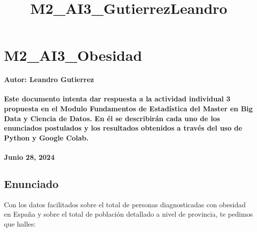 \documentclass[11pt]{article}
\title{M2\_AI3\_GutierrezLeandro}
\begin{document}
    
    \maketitle
    
    

    
    \section{M2\_AI3\_Obesidad}\label{m2_ai3_obesidad}

\paragraph{Autor: Leandro Gutierrez}\label{autor-leandro-gutierrez}

\paragraph{\texorpdfstring{Este documento intenta dar respuesta a la
actividad individual 3 propuesta en el Modulo \textbf{Fundamentos de
Estadística} del \textbf{Master en Big Data y Ciencia de Datos}. En él
se describirán cada uno de los enunciados postulados y los resultados
obtenidos a través del uso de Python y Google
Colab.}{Este documento intenta dar respuesta a la actividad individual 3 propuesta en el Modulo Fundamentos de Estadística del Master en Big Data y Ciencia de Datos. En él se describirán cada uno de los enunciados postulados y los resultados obtenidos a través del uso de Python y Google Colab.}}\label{este-documento-intenta-dar-respuesta-a-la-actividad-individual-3-propuesta-en-el-modulo-fundamentos-de-estaduxedstica-del-master-en-big-data-y-ciencia-de-datos.-en-uxe9l-se-describiruxe1n-cada-uno-de-los-enunciados-postulados-y-los-resultados-obtenidos-a-travuxe9s-del-uso-de-python-y-google-colab.}

\paragraph{Junio 28, 2024}\label{junio-28-2024}

    \subsection{Enunciado}\label{enunciado}

Con los datos facilitados sobre el total de personas diagnosticadas con
obesidad en España y sobre el total de población detallado a nivel de
provincia, te pedimos que halles:
\end{document}

